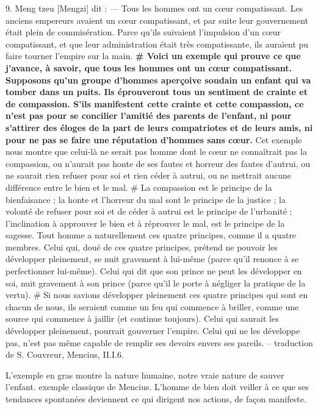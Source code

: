 \begin{singlequote}
  9.	Meng tzeu [Mengzi] dit :
—	Tous les hommes ont un cœur compatissant. Les anciens empereurs avaient un cœur compatissant, et par suite leur gouvernement était plein de commisération. Parce qu’ils suivaient l’impulsion d’un cœur compatissant, et que leur administration était très compatissante, ils auraient pu faire tourner l’empire sur la main.
\textbf{# Voici un exemple qui prouve ce que j’avance, à savoir, que tous les hommes ont un cœur compatissant. Supposons qu’un groupe d’hommes aperçoive soudain un enfant qui va tomber dans un puits. Ils éprouveront tous un sentiment de crainte et de compassion. S’ils manifestent cette crainte et cette compassion, ce n’est pas pour se concilier l’amitié des parents de l’enfant, ni pour s’attirer des éloges de la part de leurs compatriotes et de leurs amis, ni pour ne pas se faire une réputation d’hommes sans cœur.}
Cet exemple nous montre que celui-là ne serait pas homme dont le cœur ne connaîtrait pas la compassion, ou n’aurait pas honte de ses fautes et horreur des fautes d’autrui, ou ne saurait rien refuser pour soi et rien céder à autrui, ou ne mettrait aucune différence entre le bien et le mal. # La compassion est le principe de la bienfaisance ; la honte et l’horreur du mal sont le principe de la justice ; la volonté de refuser pour soi et de céder à autrui est le principe de l’urbanité ; l’inclination à approuver le bien et à réprouver le mal, est le principe de la sagesse. Tout homme a naturellement ces quatre principes, comme il a quatre membres. Celui qui, doué de ces quatre principes, prétend ne pouvoir les développer pleinement, se nuit gravement à lui-même (parce qu’il renonce à se perfectionner lui-même). Celui qui dit que son prince ne peut les développer en soi, nuit gravement à son prince (parce qu’il le porte à négliger la pratique de la vertu).
# Si nous savions développer pleinement ces quatre principes qui sont en chacun de nous, ils seraient comme un feu qui commence à briller, comme une source qui commence à jaillir (et continue toujours). Celui qui saurait les développer pleinement, pourrait gouverner l’empire. Celui qui ne les développe pas, n’est pas même capable de remplir ses devoirs envers ses pareils.
-- traduction de S. Couvreur, Mencius, II.I.6.  
\end{singlequote}



 
L'exemple en gras montre la nature humaine, notre vraie nature de sauver l'enfant. exemple classique de Mencius.
L'homme de bien doit veiller à ce que ses tendances spontanées deviennent ce qui dirigent nos actions, de façon manifeste. 

